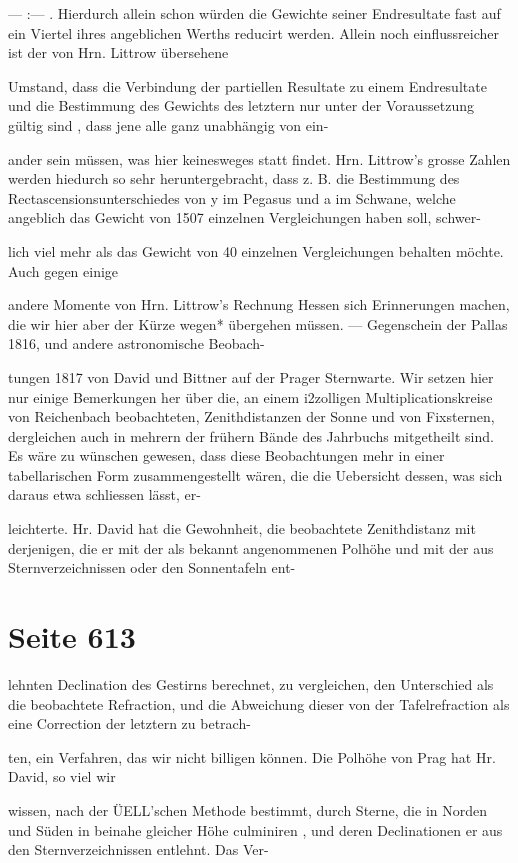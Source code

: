 \documentclass[10pt,a4paper]{article}
\begin{document}
— :— . Hierdurch allein schon würden die Gewichte seiner Endresultate fast auf ein Viertel ihres angeblichen Werths reducirt werden. Allein noch einflussreicher ist der von Hrn. Littrow übersehene

Umstand, dass die Verbindung der partiellen Resultate zu einem Endresultate und die Bestimmung des Gewichts des letztern nur unter der Voraussetzung gültig sind , dass jene alle ganz unabhängig von ein-

ander sein müssen, was hier keinesweges statt findet. Hrn. Littrow's grosse Zahlen werden hiedurch so sehr heruntergebracht, dass z. B. die Bestimmung des Rectascensionsunterschiedes von y im Pegasus und a im Schwane, welche angeblich das Gewicht von 1507 einzelnen Vergleichungen haben soll, schwer-

lich viel mehr als das Gewicht von 40 einzelnen Vergleichungen behalten möchte. Auch gegen einige

andere Momente von Hrn. Littrow's Rechnung Hessen sich Erinnerungen machen, die wir hier aber der Kürze wegen* übergehen müssen. — Gegenschein der Pallas 1816, und andere astronomische Beobach-

tungen 1817 von David und Bittner auf der Prager Sternwarte. Wir setzen hier nur einige Bemerkungen her über die, an einem i2zolligen Multiplicationskreise von Reichenbach beobachteten, Zenithdistanzen der Sonne und von Fixsternen, dergleichen auch in mehrern der frühern Bände des Jahrbuchs mitgetheilt sind. Es wäre zu wünschen gewesen, dass diese Beobachtungen mehr in einer tabellarischen Form zusammengestellt wären, die die Uebersicht dessen, was sich daraus etwa schliessen lässt, er-

leichterte. Hr. David hat die Gewohnheit, die beobachtete Zenithdistanz mit derjenigen, die er mit der als bekannt angenommenen Polhöhe und mit der aus Sternverzeichnissen oder den Sonnentafeln ent-


\newpage
\section*{Seite 613}
lehnten Declination des Gestirns berechnet, zu vergleichen, den Unterschied als die beobachtete Refraction, und die Abweichung dieser von der Tafelrefraction als eine Correction der letztern zu betrach-

ten, ein Verfahren, das wir nicht billigen können. Die Polhöhe von Prag hat Hr. David, so viel wir

wissen, nach der ÜELL'schen Methode bestimmt, durch Sterne, die in Norden und Süden in beinahe gleicher Höhe culminiren , und deren Declinationen er aus den Sternverzeichnissen entlehnt. Das Ver-
\end{document}
